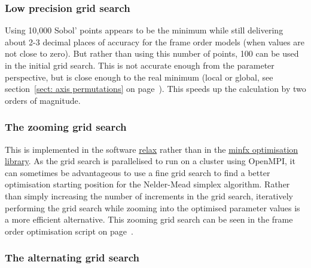 

\subsubsection{Low precision grid search}

Using 10,000 Sobol' points appears to be the minimum while still delivering about 2-3 decimal places of accuracy for the frame order models (when values are not close to zero).
But rather than using this number of points, 100 can be used in the initial grid search.
This is not accurate enough from the parameter perspective, but is close enough to the real minimum (local or global, see section~\ref{sect: axis permutations} on page~\pageref{sect: axis permutations}).
This speeds up the calculation by two orders of magnitude.





\subsubsection{The zooming grid search}

This is implemented in the software \href{http://www.nmr-relax.com}{relax} rather than in the \href{https://gna.org/projects/minfx/}{minfx optimisation library}.
As the grid search is parallelised to run on a cluster using OpenMPI, it can sometimes be advantageous to use a fine grid search to find a better optimisation starting position for the Nelder-Mead simplex algorithm.
Rather than simply increasing the number of increments in the grid search, iteratively performing the grid search while zooming into the optimised parameter values is a more efficient alternative.
This zooming grid search can be seen in the frame order optimisation script on page~\pageref{sect: frame order analysis script}.






\subsubsection{The alternating grid search}

